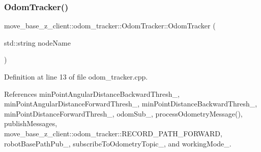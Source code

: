 \subsubsection{\texorpdfstring{Odom\+Tracker()}{OdomTracker()}}
{\footnotesize\ttfamily move\+\_\+base\+\_\+z\+\_\+client\+::odom\+\_\+tracker\+::\+Odom\+Tracker\+::\+Odom\+Tracker (\begin{DoxyParamCaption}\item[{std\+::string}]{node\+Name }\end{DoxyParamCaption})}



Definition at line 13 of file odom\+\_\+tracker.\+cpp.



References min\+Point\+Angular\+Distance\+Backward\+Thresh\+\_\+, min\+Point\+Angular\+Distance\+Forward\+Thresh\+\_\+, min\+Point\+Distance\+Backward\+Thresh\+\_\+, min\+Point\+Distance\+Forward\+Thresh\+\_\+, odom\+Sub\+\_\+, process\+Odometry\+Message(), publish\+Messages, move\+\_\+base\+\_\+z\+\_\+client\+::odom\+\_\+tracker\+::\+R\+E\+C\+O\+R\+D\+\_\+\+P\+A\+T\+H\+\_\+\+F\+O\+R\+W\+A\+RD, robot\+Base\+Path\+Pub\+\_\+, subscribe\+To\+Odometry\+Topic\+\_\+, and working\+Mode\+\_\+.


